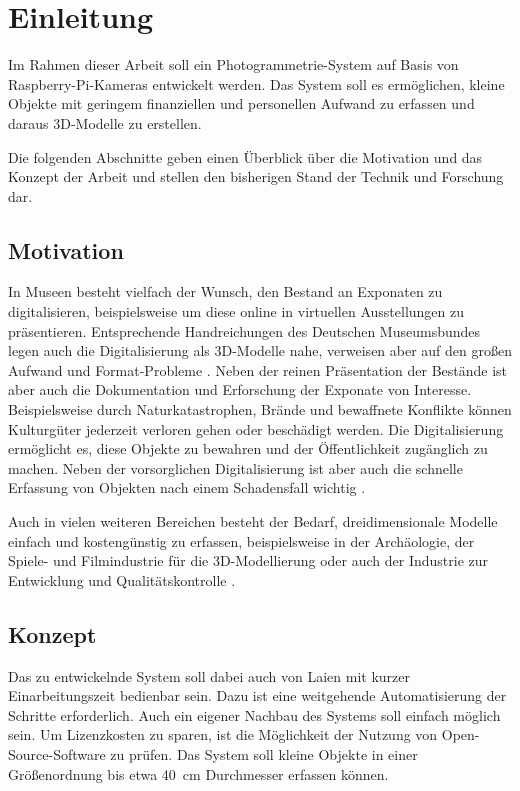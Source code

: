 \documentclass[./00PhotoBox]{subfiles}
\begin{document}
\chapter{Einleitung}
\label{c:einleitung}

Im Rahmen dieser Arbeit soll ein Photogrammetrie-System auf Basis von Raspberry-Pi-Kameras entwickelt werden. Das System soll es ermöglichen, kleine Objekte mit geringem finanziellen und personellen Aufwand zu erfassen und daraus 3D-Modelle zu erstellen.

Die folgenden Abschnitte geben einen Überblick über die Motivation und das Konzept der Arbeit und stellen den bisherigen Stand der Technik und Forschung dar.

\section{Motivation}

In Museen besteht vielfach der Wunsch, den Bestand an Exponaten zu digitalisieren, beispielsweise um diese online in virtuellen Ausstellungen zu präsentieren. Entsprechende Handreichungen des Deutschen Museumsbundes legen auch die Digitalisierung als 3D-Modelle nahe, verweisen aber auf den großen Aufwand und Format-Probleme \citep[vgl.][S. 43]{handreichung_digital}. Neben der reinen Präsentation der Bestände ist aber auch die Dokumentation und Erforschung der Exponate von Interesse. Beispielsweise durch Naturkatastrophen, Brände und bewaffnete Konflikte können Kulturgüter jederzeit verloren gehen oder beschädigt werden. Die Digitalisierung ermöglicht es, diese Objekte zu bewahren und der Öffentlichkeit zugänglich zu machen. Neben der vorsorglichen Digitalisierung ist aber auch die schnelle Erfassung von Objekten nach einem Schadensfall wichtig \citep[vgl.][]{kulturgutretter}.

Auch in vielen weiteren Bereichen besteht der Bedarf, dreidimensionale Modelle einfach und kostengünstig zu erfassen, beispielsweise in der Archäologie, der Spiele- und Filmindustrie für die 3D-Modellierung oder auch der Industrie zur Entwicklung und Qualitätskontrolle \citep[vgl.][S. 37f]{luhmann}.

\section{Konzept}
Das zu entwickelnde System soll dabei auch von Laien mit kurzer Einarbeitungszeit bedienbar sein. Dazu ist eine weitgehende Automatisierung der Schritte erforderlich. Auch ein eigener Nachbau des Systems soll einfach möglich sein. Um Lizenzkosten zu sparen, ist die Möglich\-keit der Nutzung von Open-Source-Software zu prüfen. Das System soll kleine Objekte in einer Größenordnung bis etwa \SI{40}{\centi\metre} Durchmesser erfassen können.
\end{document}
